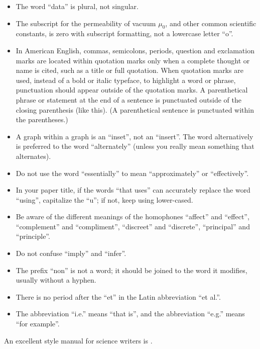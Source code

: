 \documentclass[conference]{IEEEtran}
\begin{document}
    \begin{itemize}
        \item The word ``data'' is plural, not singular.
        \item The subscript for the permeability of vacuum $\mu_{0}$, and other common 
              scientific constants, is zero with subscript formatting, not a lowercase 
              letter ``o''.
        \item In American English, commas, semicolons, periods, question and exclamation 
              marks are located within quotation marks only when a complete thought or 
              name is cited, such as a title or full quotation. When quotation marks are 
              used, instead of a bold or italic typeface, to highlight a word or phrase, 
              punctuation should appear outside of the quotation marks. A parenthetical 
              phrase or statement at the end of a sentence is punctuated outside of the 
              closing parenthesis (like this). (A parenthetical sentence is punctuated 
              within the parentheses.)
        \item A graph within a graph is an ``inset'', not an ``insert''. The word 
              alternatively is preferred to the word ``alternately'' (unless you really 
              mean something that alternates).
        \item Do not use the word ``essentially'' to mean ``approximately'' or 
              ``effectively''.
        \item In your paper title, if the words ``that uses'' can accurately replace the 
              word ``using'', capitalize the ``u''; if not, keep using lower-cased.
        \item Be aware of the different meanings of the homophones ``affect'' and 
              ``effect'', ``complement'' and ``compliment'', ``discreet'' and 
              ``discrete'', ``principal'' and ``principle''.
        \item Do not confuse ``imply'' and ``infer''.
        \item The prefix ``non'' is not a word; it should be joined to the word it 
              modifies, usually without a hyphen.
        \item There is no period after the ``et'' in the Latin abbreviation ``et al.''.
        \item The abbreviation ``i.e.'' means ``that is'', and the abbreviation ``e.g.'' 
              means ``for example''.
    \end{itemize}
    An excellent style manual for science writers is .
\end{document}
